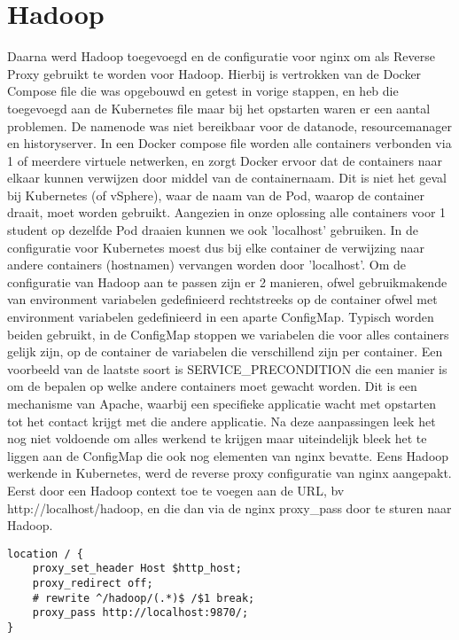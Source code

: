 \section{Hadoop}
Daarna werd Hadoop toegevoegd en de configuratie voor nginx om als Reverse Proxy gebruikt te worden voor Hadoop. Hierbij is vertrokken van de Docker Compose file die was opgebouwd en getest in vorige stappen, en heb die toegevoegd aan de Kubernetes file maar bij het opstarten waren er een aantal problemen. De namenode was niet bereikbaar voor de datanode, resourcemanager en historyserver.
In een Docker compose file worden alle containers verbonden via 1 of meerdere virtuele netwerken, en zorgt Docker ervoor dat de containers naar elkaar kunnen verwijzen door middel van de containernaam. Dit is niet het geval bij Kubernetes (of vSphere), waar de naam van de Pod, waarop de container draait, moet worden gebruikt. Aangezien in onze oplossing alle containers voor 1 student op dezelfde Pod draaien kunnen we ook 'localhost' gebruiken.\newline
In de configuratie voor Kubernetes moest dus bij elke container de verwijzing naar andere containers (hostnamen) vervangen worden door 'localhost'.
\newline
\newline
Om de configuratie van Hadoop aan te passen zijn er 2 manieren, ofwel gebruikmakende van environment variabelen gedefinieerd rechtstreeks op de container ofwel met environment variabelen gedefinieerd in een aparte ConfigMap. Typisch worden beiden gebruikt, in de ConfigMap stoppen we variabelen die voor alles containers gelijk zijn, op de container de variabelen die verschillend zijn per container. Een voorbeeld van de laatste soort is SERVICE\_PRECONDITION die een manier is om de bepalen op welke andere containers moet gewacht worden. Dit is een mechanisme van Apache, waarbij een specifieke applicatie wacht met opstarten tot het contact krijgt met die andere applicatie.
\newline
\newline
Na deze aanpassingen leek het nog niet voldoende om alles werkend te krijgen maar uiteindelijk bleek het te liggen aan de ConfigMap die ook nog elementen van nginx bevatte.
\newline
\newline
Eens Hadoop werkende in Kubernetes, werd de reverse proxy configuratie van nginx aangepakt. Eerst door een Hadoop context toe te voegen aan de URL, bv http://localhost/hadoop, en die dan via de nginx proxy\_pass door te sturen naar Hadoop.
\newline
\newline
\begin{lstlisting}
location / {
    proxy_set_header Host $http_host;
    proxy_redirect off;
    # rewrite ^/hadoop/(.*)$ /$1 break;
    proxy_pass http://localhost:9870/;
}

\end{lstlisting}

